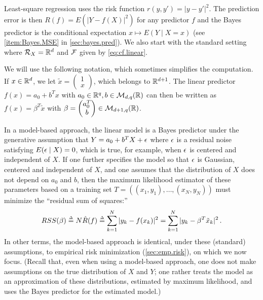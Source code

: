 Least-square regression uses the risk function $r(y,y') = |y-y'|^2$. The prediction error is then $R(f) = E(|Y-f(X)|^2)$ for any predictor $f$ and the Bayes predictor is the conditional expectation $x \mapsto E(Y\mid X=x)$ (see \cref{item:Bayes.MSE} in \cref{sec:bayes.pred}). We also start with the standard setting where ${\mathcal R}_X = {\mathbb{R}}^d$ and
${\mathcal F}$ given by \eqref{eq:cf.linear}. 

We will use the following notation, which sometimes simplifies the computation. If $x\in {\mathbb{R}}^d$, we let $\tilde x = \begin{pmatrix}1\\x\end{pmatrix}$, which belongs to ${\mathbb{R}}^{d+1}$. The linear predictor 
$
f(x) = {a_0} + b^T x
$
with ${a_0}\in {\mathbb{R}}^{q}, b\in {\mathcal M}_{d,q}({\mathbb{R}})$ can then be written as $f(x) = \beta^{T} \tilde x$ with $\beta =
\begin{pmatrix} a_0^{T}\\ b\end{pmatrix} \in {\mathcal M}_{d+1,q}({\mathbb{R}})$.  

In a model-based approach, the linear model is a Bayes predictor under the generative assumption that $Y = {a_0} + b^T X + \epsilon$ where $\epsilon$ is a residual noise satisfying $E(\epsilon\mid X) = 0$, which is true, for example, when $\epsilon$ is centered and independent of $X$. If one further specifies the model so that $\epsilon$ is Gaussian, centered and independent of $X$, and one  assumes that the distribution of $X$ does not depend on ${a_0}$ and $b$, then the maximum likelihood estimator of these parameters based on a training set $T = ((x_1, y_1), \ldots, (x_N, y_N))$ must minimize the ``residual sum of squares:''
\[
RSS(\beta) \stackrel{{\scriptscriptstyle \Delta}}{=} N\hat R(f) \stackrel{{\scriptscriptstyle \Delta}}{=} \sum_{k=1}^N |y_k - f(x_k)|^2  = \sum_{k=1}^N |y_k -
\beta^{T} {\tilde{x}}_k|^2 \,.
\]
In other terms, the model-based approach is identical, under these (standard) assumptions, to empirical risk minimization (\cref{sec:emp.risk}), on which we now focus. (Recall that, even when using a model-based approach, one does not make assumptions on the true distribution of $X$ and $Y$; one rather treats the model as an approximation of these distributions, estimated by maximum likelihood, and uses the Bayes predictor for the estimated model.) 

